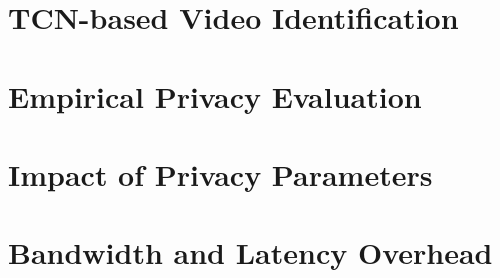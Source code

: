 \section{TCN-based Video Identification}\label{sec:eval-tcn}


\section{Empirical Privacy Evaluation}\label{sec:eval-empirical-privacy}


\section{Impact of Privacy Parameters}\label{sec:eval-privacy-params}


\section{Bandwidth and Latency Overhead}\label{sec:eval-bw}
